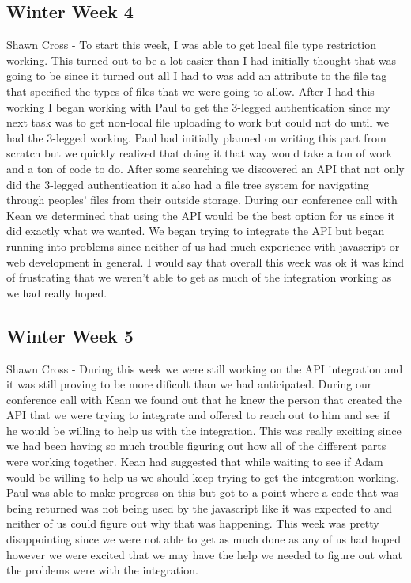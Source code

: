 \documentclass[10pt,draftclsnofoot,onecolumn]{IEEEtran}
\begin{document}
\subsection{Winter Week 4}
Shawn Cross - To start this week, I was able to get local file type restriction working. This turned out to be a lot easier than I had initially thought that was going to be since it turned out all I had to was add an attribute to the file tag that specified the types of files that we were going to allow. After I had this working I began working with Paul to get the 3-legged authentication since my next task was to get non-local file uploading to work but could not do until we had the 3-legged working. Paul had initially planned on writing this part from scratch but we quickly realized that doing it that way would take a ton of work and a ton of code to do. After some searching we discovered an API that not only did the 3-legged authentication it also had a file tree system for navigating through peoples' files from their outside storage. During our conference call with Kean we determined that using the API would be the best option for us since it did exactly what we wanted. We began trying to integrate the API but began running into problems since neither of us had much experience with javascript or web development in general. I would say that overall this week was ok it was kind of frustrating that we weren't able to get as much of the integration working as we had really hoped. 
\subsection{Winter Week 5}
Shawn Cross - During this week we were still working on the API integration and it was still proving to be more dificult than we had anticipated. During our conference call with Kean we found out that he knew the person that created the API that we were trying to integrate and offered to reach out to him and see if he would be willing to help us with the integration. This was really exciting since we had been having so much trouble figuring out how all of the different parts were working together. Kean had suggested that while waiting to see if Adam would be willing to help us we should keep trying to get the integration working. Paul was able to make progress on this but got to a point where a code that was being returned was not being used by the javascript like it was expected to and neither of us could figure out why that was happening. This week was pretty disappointing since we were not able to get as much done as any of us had hoped however we were excited that we may have the help we needed to figure out what the problems were with the integration. 
\end{document}
